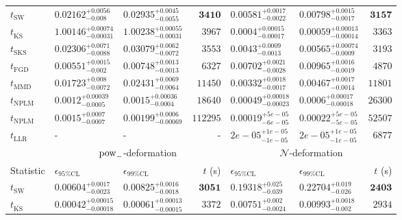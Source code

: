 \begin{tabular}{l|llr|llr}
	\midrule
	$t_{\mathrm{SW}}$ & $0.02162_{-0.008}^{+0.0056}$ & $0.02935_{-0.0055}^{+0.0045}$ & ${\mathbf{3410}}$ & $0.00581_{-0.0022}^{+0.0017}$ & $0.00798_{-0.0017}^{+0.0015}$ & ${\mathbf{3157}}$ \\
	$t_{\overline{\mathrm{KS}}}$ & $1.00146_{-0.00031}^{+0.00074}$ & $1.00238_{-0.00031}^{+0.00055}$ & $3967$ & ${\mathbf{0.0004_{-0.00017}^{+0.00015}}}$ & ${\mathbf{0.00059_{-0.00014}^{+0.00013}}}$ & $3363$ \\
	$t_{\mathrm{SKS}}$ & $0.02306_{-0.0088}^{+0.0071}$ & $0.03079_{-0.0072}^{+0.0062}$ & $3553$ & $0.0043_{-0.0013}^{+0.0009}$ & $0.00565_{-0.0009}^{+0.00074}$ & $3193$ \\
	$t_{\mathrm{FGD}}$ & ${\mathbf{0.00551_{-0.002}^{+0.0015}}}$ & ${\mathbf{0.00748_{-0.0013}^{+0.0013}}}$ & $6327$ & $0.00702_{-0.0028}^{+0.0021}$ & $0.00965_{-0.0019}^{+0.0016}$ & $4870$ \\
	$t_{\mathrm{MMD}}$ & $0.01723_{-0.0072}^{+0.008}$ & $0.02431_{-0.0064}^{+0.0069}$ & $11450$ & $0.00332_{-0.0017}^{+0.0018}$ & $0.00467_{-0.0014}^{+0.0017}$ & $11801$ \\
\rowcolor{red!35}	$t_{\mathrm{NPLM}}$ & $0.0012_{-0.0005}^{+0.00039}$ & $0.0015_{-0.0004}^{+0.00036}$ & $18640$ & $0.00049_{-0.00023}^{+0.00018}$ & $0.0006_{-0.00018}^{+0.00017}$ & $26300$ \\
\rowcolor{blue!35}	$t_{\mathrm{NPLM}}$ & $0.0015_{-0.0007}^{+0.0007}$ & $0.00199_{-0.00069}^{+0.0006}$ & $112295$ & $0.00019_{-6e-05}^{+5e-05}$ & $0.00022_{-5e-05}^{+5e-05}$ & $52507$ \\
	$t_{\mathrm{LLR}}$ & - & - & - & $2e-05_{-1e-05}^{+1e-05}$ & $2e-05_{-1e-05}^{+1e-05}$ & $6877$ \\
	\toprule
	\multicolumn{1}{c}{} & \multicolumn{3}{c}{$\rm{pow}_{-}$-deformation} & \multicolumn{3}{c}{$\mathcal{N}$-deformation} \\
	Statistic & $\epsilon_{95\%\mathrm{CL}}$ & $\epsilon_{99\%\mathrm{CL}}$ & $t$ (s) & $\epsilon_{95\%\mathrm{CL}}$ & $\epsilon_{99\%\mathrm{CL}}$ & $t$ (s) \\
	\midrule
	$t_{\mathrm{SW}}$ & $0.00604_{-0.0023}^{+0.0017}$ & $0.00825_{-0.0018}^{+0.0016}$ & ${\mathbf{3051}}$ & $0.19318_{-0.039}^{+0.025}$ & $0.22704_{-0.026}^{+0.019}$ & ${\mathbf{2403}}$ \\
	$t_{\overline{\mathrm{KS}}}$ & ${\mathbf{0.00042_{-0.00018}^{+0.00015}}}$ & ${\mathbf{0.00061_{-0.00015}^{+0.00013}}}$ & $3372$ & ${\mathbf{0.00751_{-0.0024}^{+0.002}}}$ & ${\mathbf{0.00993_{-0.002}^{+0.0018}}}$ & $2934$ \\

\end{tabular}
